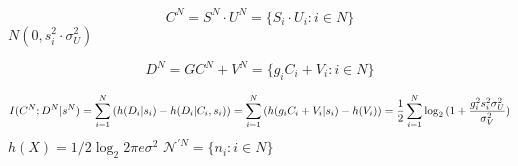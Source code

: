 \begin{equation}
C^N= S^N \cdot U^N = \{ S_i\cdot U_i : i \in N \}
\end{equation}
$N(0, s_i^2 \cdot \sigma^2_U)$

\begin{equation}
D^N= GC^N + V^N = \{ g_i C_i + V_i : i \in N \}
\end{equation}

\begin{equation}
I(C^N; D^N|s^N)  = \sum_{i=1}^N{(h(D_i|s_i)-h(D_i|C_i,s_i))} \\
= \sum_{i=1}^N{(h( g_i C_i + V_i|s_i)-h(V_i))} \\
= \frac{1}{2}\sum_{i=1}^N{\log_2{(1+\frac{g_i^2s_i^2\sigma^2_U}{\sigma^2_V})}}
\end{equation}
$h(X)=1/2\log_2{2\pi e \sigma^2}$
$\mathcal{N}^{\prime N} = \{ n_i : i \in N \} $